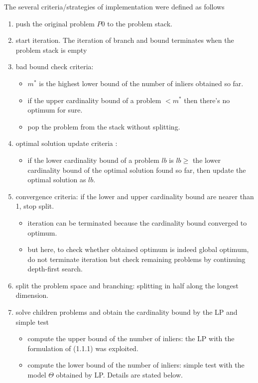 \documentclass[paper=a4, fontsize=11pt]{scrartcl} %
\numberwithin{equation}{section} %
\numberwithin{figure}{section} %
\numberwithin{table}{section} %
\begin{document}
\pagebreak

The several criteria/strategies of implementation were defined as follows

\begin{enumerate}
\item push the original problem $P0$ to the problem stack.
\item start iteration. The iteration of branch and bound terminates when the problem stack is empty
\item bad bound check criteria: 
	\begin{itemize}
	\item $m^*$ is the highest lower bound of the number of inliers obtained so far.
	\item if the upper cardinality bound of a problem $< m^*$ then there's no optimum for sure.
	\item pop the problem from the stack without splitting.
	\end{itemize}
\item optimal solution update criteria :
	\begin{itemize}
	\item if the lower cardinality bound of a problem $lb$ is $lb \geq$ the lower cardinality bound of the optimal solution found so far, then update the optimal solution as $lb$.  
	\end{itemize}
\item convergence criteria: if the lower and upper cardinality bound are nearer than 1, stop split. 
	\begin{itemize}
	\item iteration can be terminated because the cardinality bound converged to optimum. 
	\item but here, to check whether obtained optimum is indeed global optimum, do not terminate iteration but check remaining problems by continuing depth-first search. 
	\end{itemize}
\item split the problem space and branching: splitting in half along the longest dimension. 
\item solve children problems and obtain the cardinality bound by the LP and simple test
	\begin{itemize}
	\item compute the upper bound of the number of inliers: the LP with the formulation of (1.1.1) was exploited.
	\item compute the lower bound of the number of inliers: simple test with the model $\Theta$ obtained by LP. Details are stated below.

\end{itemize}
\end{enumerate}
\end{document}
